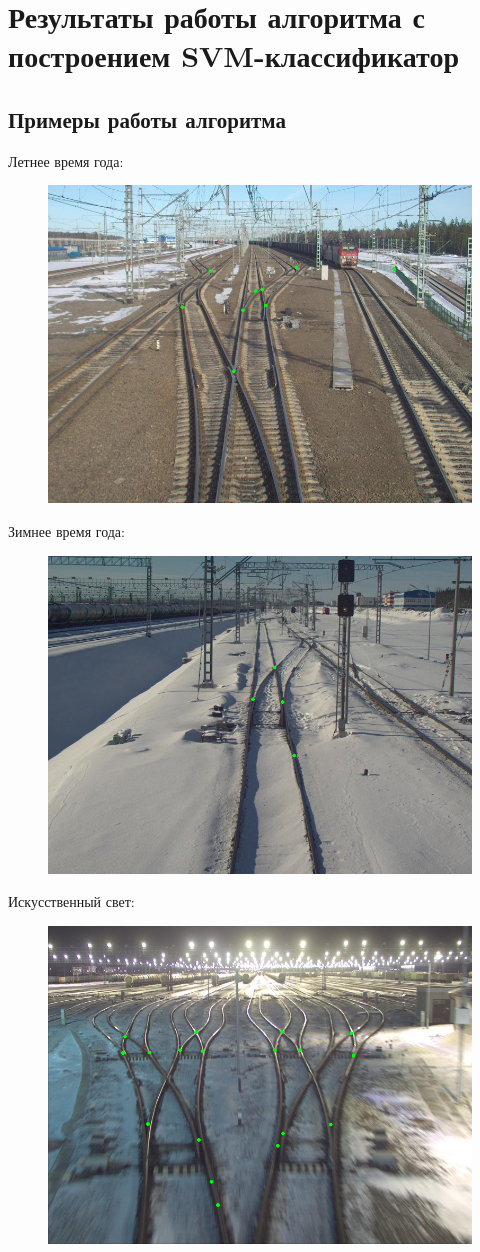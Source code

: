 \section{Результаты работы алгоритма с построением SVM-классификатор}
\subsection{Примеры работы алгоритма}
Летнее время года:
\begin{figure}[!h]
	\centering
	\includegraphics[width=0.7\linewidth]{pictures/103.png}
	\caption[Y - обратное]{}
	\label{fig:103}
\end{figure}
\newpage
Зимнее время года:
\begin{figure}[!h]
	\centering
	\includegraphics[width=0.7\linewidth]{pictures/146.png}
	\caption[Y - обратное]{}
	\label{fig:105}
\end{figure}
\newline
Искусственный свет:
\begin{figure}[!h]
	\centering
	\includegraphics[width=0.7\linewidth]{pictures/isk.png}
	\caption[Y - обратное]{}
	\label{fig:isk}
\end{figure}

